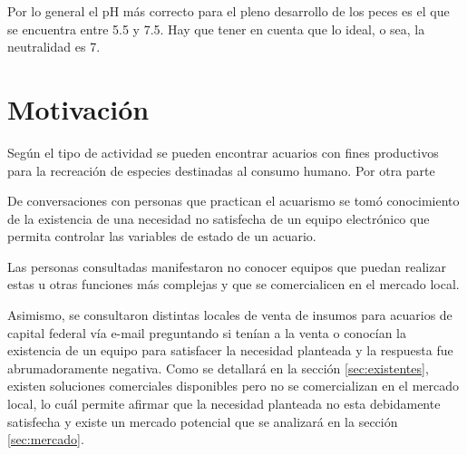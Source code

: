 Por lo general el pH más correcto para el pleno desarrollo de los peces es el que se encuentra entre 5.5 y 7.5. Hay que tener en cuenta que lo ideal, o sea, la neutralidad es 7.

%
%



\section{Motivación}

Según el tipo de actividad se pueden encontrar acuarios con fines productivos para la recreación de especies destinadas al consumo humano.  Por otra parte

De conversaciones con personas que practican el acuarismo se tomó conocimiento de la existencia de una necesidad no satisfecha de un equipo electrónico que permita controlar las variables de estado de un acuario. 
 
Las personas consultadas manifestaron no conocer equipos que puedan realizar estas u otras funciones más complejas y que se comercialicen en el mercado local.  

Asimismo, se consultaron distintas locales de venta de insumos para acuarios de capital federal vía e-mail preguntando si tenían a la venta o conocían la existencia de un equipo para satisfacer la necesidad planteada y la respuesta fue abrumadoramente negativa. Como se detallará en la sección \ref{sec:existentes}, existen soluciones comerciales disponibles pero no se comercializan en el mercado local, lo cuál permite afirmar que la necesidad planteada no esta debidamente satisfecha y existe un mercado potencial que se analizará en la sección \ref{sec:mercado}.
%

